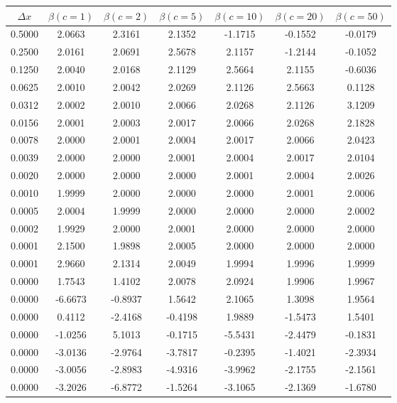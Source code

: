\begin{tabular}{|c|c|c|c|c|c|c|}
\hline
\textbf{$\Delta x$}&\textbf{$\beta(c=1)$}&\textbf{$\beta(c=2)$}&\textbf{$\beta(c=5)$}&\textbf{$\beta(c=10)$}&\textbf{$\beta(c=20)$}&\textbf{$\beta(c=50)$}\\\hline
0.5000&2.0663&2.3161&2.1352&-1.1715&-0.1552&-0.0179\\\hline
0.2500&2.0161&2.0691&2.5678&2.1157&-1.2144&-0.1052\\\hline
0.1250&2.0040&2.0168&2.1129&2.5664&2.1155&-0.6036\\\hline
0.0625&2.0010&2.0042&2.0269&2.1126&2.5663&0.1128\\\hline
0.0312&2.0002&2.0010&2.0066&2.0268&2.1126&3.1209\\\hline
0.0156&2.0001&2.0003&2.0017&2.0066&2.0268&2.1828\\\hline
0.0078&2.0000&2.0001&2.0004&2.0017&2.0066&2.0423\\\hline
0.0039&2.0000&2.0000&2.0001&2.0004&2.0017&2.0104\\\hline
0.0020&2.0000&2.0000&2.0000&2.0001&2.0004&2.0026\\\hline
0.0010&1.9999&2.0000&2.0000&2.0000&2.0001&2.0006\\\hline
0.0005&2.0004&1.9999&2.0000&2.0000&2.0000&2.0002\\\hline
0.0002&1.9929&2.0000&2.0001&2.0000&2.0000&2.0000\\\hline
0.0001&2.1500&1.9898&2.0005&2.0000&2.0000&2.0000\\\hline
0.0001&2.9660&2.1314&2.0049&1.9994&1.9996&1.9999\\\hline
0.0000&1.7543&1.4102&2.0078&2.0924&1.9906&1.9967\\\hline
0.0000&-6.6673&-0.8937&1.5642&2.1065&1.3098&1.9564\\\hline
0.0000&0.4112&-2.4168&-0.4198&1.9889&-1.5473&1.5401\\\hline
0.0000&-1.0256&5.1013&-0.1715&-5.5431&-2.4479&-0.1831\\\hline
0.0000&-3.0136&-2.9764&-3.7817&-0.2395&-1.4021&-2.3934\\\hline
0.0000&-3.0056&-2.8983&-4.9316&-3.9962&-2.1755&-2.1561\\\hline
0.0000&-3.2026&-6.8772&-1.5264&-3.1065&-2.1369&-1.6780\\\hline
\end{tabular}
